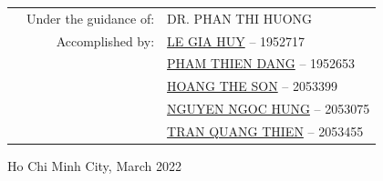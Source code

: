 \documentclass[a4paper]{article}
\begin{document}
\begin{titlepage}
\begin{table}[h]
\begin{tabular}{rrl}
\hspace{5 cm} & Under the guidance of: & DR. PHAN THI HUONG\\

& Accomplished by: & \href{mailto:huy.le0107@hcmut.edu.vn}{LE GIA HUY} -- 1952717 \\
&                  & \href{mailto:dang.pham1310@hcmut.edu.vn}{PHAM THIEN DANG} -- 1952653 \\
&                  & \href{mailto:son.hoangthe@hcmut.edu.vn}{HOANG THE SON} -- 2053399 \\
&                  & \href{mailto:hung.nguyenskr2509@hcmut.edu.vn}{NGUYEN NGOC HUNG} -- 2053075 \\
&                  & \href{mailto:thien.tran31@hcmut.edu.vn}{TRAN QUANG THIEN} -- 2053455 \\
\end{tabular}

\end{table}
\vspace{1.5cm}
\begin{center}
{\footnotesize Ho Chi Minh City, March 2022}
\end{center}
\end{titlepage}


\tableofcontents
\newpage
\noindent
\end{document}
